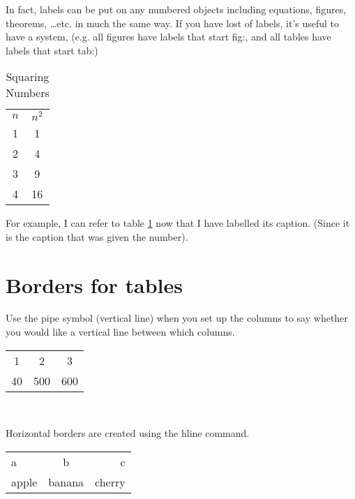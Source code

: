 \documentclass[a4paper,11pt]{article}
\begin{document}
In fact, labels can be put on any numbered objects including equations,  figures, theorems, \dots etc. in much the same way. If you have lost of labels, it's useful to have a system, (e.g. all figures have labels that start fig:, and all tables have labels that start tab:)
%
\begin{table}[hbtp]
	\centering
	\begin{tabular}{c c}
	  $n$ & $n^2$ \\
		1 & 1 \\
		2 & 4 \\
		3 & 9 \\
		4 & 16 \\
	\end{tabular}
	\caption{Squaring Numbers} \label{tab:squaringnumbers}
\end{table}

For example, I can refer to table \ref{tab:squaringnumbers} now that I have labelled its caption. (Since it is the caption that was given the number).

\pagebreak

\section{Borders for tables}

Use the pipe symbol (vertical line) when you set up the columns to say whether you would like a vertical line between which columns.
%
\begin{table}[hbtp]
	\centering
	\begin{tabular}{| c || c c}
    	1  & 2   & 3 \\
    	40 & 500 & 600
    \end{tabular}\\
\end{table}

Horizontal borders are created using the hline command.
%
\begin{table}[hbtp]
	\centering
	\begin{tabular}{l c r}
		\hline  %
		a     & b      & c \\
		apple & banana & cherry \\
		\hline  %
	\end{tabular}
\end{table}
\end{document}
